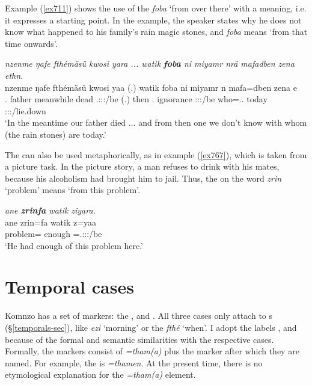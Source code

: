 Example (\ref{ex711}) shows the use of the   \emph{foba} `from over there' with a  meaning, i.e. it expresses a starting point. In the example, the speaker states why he does not know what happened to his family's rain magic stones, and \emph{foba} means `from that time onwards'.

\begin{exe}
	\ex \emph{nzenme ŋafe fthémäsü kwosi yara ... watik \textbf{foba} ni miyamr nrä mafadben zena ethn.}\\
	\gll nzenme ŋafe fthémäsü kwosi yaa (.) watik foba ni miyamr n mafa=dben zena e\\
	\Fnsg.{\Poss} father meanwhile dead \Tsg.\Masc:\Sbj:\Pst:\Ipfv/be (.) then \Dist.{\Abl} {\Fnsg} ignorance \Fpl:\Sbj:\Nonpast:\Ipfv/be who=\Loc.\Anim.{\Sg} today \Stpl:\Sbj:\Nonpast:\Ipfv/lie.down\\
	\trans `In the meantime our father died ... and from then one we don't know with whom (the rain stones) are today.'
	\label{ex711}
\end{exe}

The  can also be used metaphorically, as in example (\ref{ex767}), which is taken from a picture task. In the picture story, a man refuses to drink with his mates, because his alcoholism had brought him to jail. Thus, the  on the word \emph{zrin} `problem' means `from this problem'.

\begin{exe}
	\ex \emph{ane \textbf{zrinfa} watik ziyara.}\\
	\gll ane zrin=fa watik z=yaa\\
	{\Dem} problem={\Abl} enough \Prox=\Tsg.\Masc:\Sbj:\Pst:\Ipfv/be\\
	\trans `He had enough of this problem here.'
	\label{ex767}
\end{exe}

\section{Temporal cases}\label{temporalcase}

Komnzo has a set of   markers: the  ,  and . All three  cases only attach to  s ({\S}\ref{temporals-sec}), like \emph{ezi} `morning' or the  \emph{fthé} `when'. I adopt the labels ,  and  because of the formal and semantic similarities with the respective cases. Formally, the   markers consist of \emph{=tham(a)} plus the  marker after which they are named. For example, the   is \emph{=thamen}. At the present time, there is no etymological explanation for the \emph{=tham(a)} element.
   
